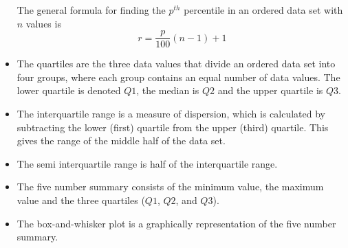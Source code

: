 \begin{itemize}[itemsep=6pt]
The general formula for finding the $p^{th}$ percentile in an ordered data set with $n$ values is 
\begin{equation*}
  r = \frac{p}{100}\left(n-1\right)+1
\end{equation*}

\item The quartiles are the three data values that divide an ordered data set into four groups, where each group contains an equal number of data values. The lower quartile is denoted $Q1$, the median is $Q2$ and the upper quartile is $Q3$.

\item The interquartile range is a measure of dispersion, which is calculated by subtracting the lower (first) quartile from the upper (third) quartile. This gives the range of the middle half of the data set.

\item The semi interquartile range is half of the interquartile range. 

\item The five number summary consists of the minimum value, the maximum value and the three quartiles ($Q1$, $Q2$, and $Q3$). 

\item The box-and-whisker plot is a graphically representation of the five number summary.
\end{itemize}
